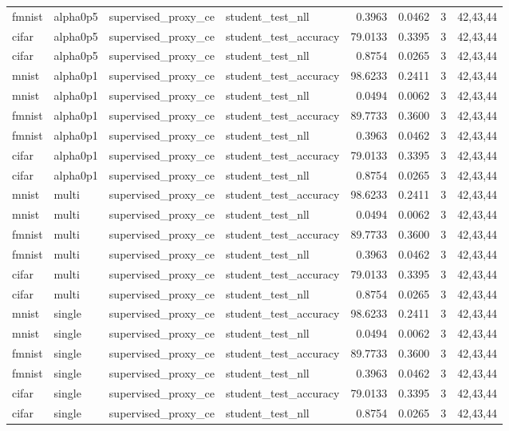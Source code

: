\begin{tabular}{llllrrrl}
fmnist & alpha0p5 & supervised\_proxy\_ce & student\_test\_nll & 0.3963 & 0.0462 & 3 & 42,43,44 \\
cifar & alpha0p5 & supervised\_proxy\_ce & student\_test\_accuracy & 79.0133 & 0.3395 & 3 & 42,43,44 \\
cifar & alpha0p5 & supervised\_proxy\_ce & student\_test\_nll & 0.8754 & 0.0265 & 3 & 42,43,44 \\
mnist & alpha0p1 & supervised\_proxy\_ce & student\_test\_accuracy & 98.6233 & 0.2411 & 3 & 42,43,44 \\
mnist & alpha0p1 & supervised\_proxy\_ce & student\_test\_nll & 0.0494 & 0.0062 & 3 & 42,43,44 \\
fmnist & alpha0p1 & supervised\_proxy\_ce & student\_test\_accuracy & 89.7733 & 0.3600 & 3 & 42,43,44 \\
fmnist & alpha0p1 & supervised\_proxy\_ce & student\_test\_nll & 0.3963 & 0.0462 & 3 & 42,43,44 \\
cifar & alpha0p1 & supervised\_proxy\_ce & student\_test\_accuracy & 79.0133 & 0.3395 & 3 & 42,43,44 \\
cifar & alpha0p1 & supervised\_proxy\_ce & student\_test\_nll & 0.8754 & 0.0265 & 3 & 42,43,44 \\
mnist & multi & supervised\_proxy\_ce & student\_test\_accuracy & 98.6233 & 0.2411 & 3 & 42,43,44 \\
mnist & multi & supervised\_proxy\_ce & student\_test\_nll & 0.0494 & 0.0062 & 3 & 42,43,44 \\
fmnist & multi & supervised\_proxy\_ce & student\_test\_accuracy & 89.7733 & 0.3600 & 3 & 42,43,44 \\
fmnist & multi & supervised\_proxy\_ce & student\_test\_nll & 0.3963 & 0.0462 & 3 & 42,43,44 \\
cifar & multi & supervised\_proxy\_ce & student\_test\_accuracy & 79.0133 & 0.3395 & 3 & 42,43,44 \\
cifar & multi & supervised\_proxy\_ce & student\_test\_nll & 0.8754 & 0.0265 & 3 & 42,43,44 \\
mnist & single & supervised\_proxy\_ce & student\_test\_accuracy & 98.6233 & 0.2411 & 3 & 42,43,44 \\
mnist & single & supervised\_proxy\_ce & student\_test\_nll & 0.0494 & 0.0062 & 3 & 42,43,44 \\
fmnist & single & supervised\_proxy\_ce & student\_test\_accuracy & 89.7733 & 0.3600 & 3 & 42,43,44 \\
fmnist & single & supervised\_proxy\_ce & student\_test\_nll & 0.3963 & 0.0462 & 3 & 42,43,44 \\
cifar & single & supervised\_proxy\_ce & student\_test\_accuracy & 79.0133 & 0.3395 & 3 & 42,43,44 \\
cifar & single & supervised\_proxy\_ce & student\_test\_nll & 0.8754 & 0.0265 & 3 & 42,43,44 \\
\bottomrule
\end{tabular}
